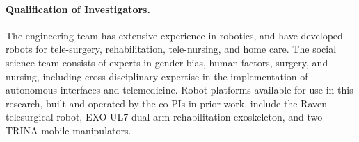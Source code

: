 \paragraph*{Qualification of Investigators.}
The engineering team has extensive experience in robotics, and have developed robots for tele-surgery, rehabilitation, tele-nursing, and home care. The social science team consists of experts in gender bias, human factors, surgery, and nursing, including cross-disciplinary expertise in the implementation of autonomous interfaces and telemedicine. Robot platforms available for use in this research, built and operated by the co-PIs in prior work, include the Raven telesurgical robot, EXO-UL7 dual-arm rehabilitation exoskeleton, and two TRINA mobile manipulators. 


